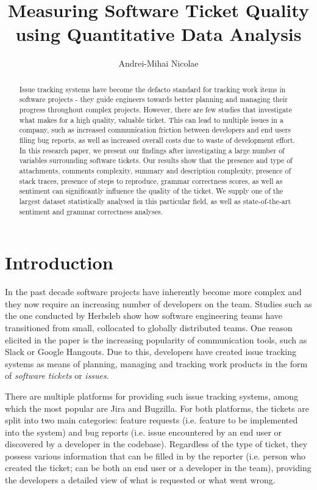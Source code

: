 \documentclass{mpaper}
\begin{document}
\title{Measuring Software Ticket Quality using Quantitative Data Analysis}
\author{Andrei-Mihai Nicolae}

\maketitle

\begin{abstract}
Issue tracking systems have become the defacto standard for tracking work items in 
software projects - they guide engineers towards better planning and 
managing their progress throughout complex projects. However, there
are few studies that investigate what makes for a high quality,
valuable ticket. This can lead to multiple issues in a company, such as 
increased communication friction between developers and end users filing bug
reports, as well as increased overall costs due to waste of development effort. 
In this research paper, we present our findings after 
investigating a large number of variables surrounding software tickets.
Our results show that the presence and type of attachments,
comments complexity, summary and description complexity, presence of stack traces, presence
of steps to reproduce, grammar correctness scores, as well as sentiment can significantly influence 
the quality of the ticket. We supply one of the largest dataset statistically 
analysed in this particular field, as well as state-of-the-art sentiment and grammar correctness analyses.
\end{abstract}

\section{Introduction}\label{intro}

In the past decade software projects have inherently become more complex and they now require an increasing number of developers 
on the team. Studies such as the one conducted by Herbsleb \cite{herbsleb2007global} show how software engineering teams have 
transitioned from small, collocated to globally distributed teams. One reason elicited in the paper is the increasing 
popularity of communication tools, such as Slack or Google Hangouts. Due to this, developers have created issue tracking 
systems as means of planning, managing and tracking work products in the form of \emph{software tickets} or \emph{issues}.

There are multiple platforms for providing such issue tracking systems, among which
the most popular are Jira and Bugzilla. For both platforms,
the tickets are split into two main categories: feature requests (i.e. feature to be 
implemented into the system) and bug reports (i.e. issue encountered by an end user or
discovered by a developer in the codebase). Regardless of the type of ticket, they possess
various information that can be filled in by the reporter (i.e. person who created the ticket; 
can be both an end user or a developer in the team), providing the developers
a detailed view of what is requested or what went wrong.
\end{document}
